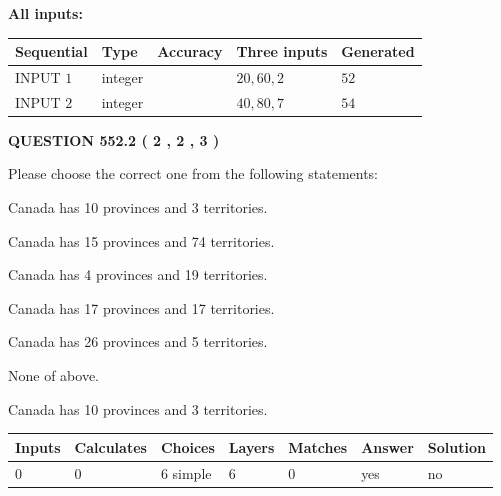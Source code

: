 \documentclass[12pt]{article}
\begin{document}
   
   
   
\noindent\vspace{0.1in}\hspace{-0.08in} {\textbf{\Large{All inputs: }}}
   
   
  
  
\noindent\begin{tabular}{|l|l|l|l|l|}
\hline
 Sequential & Type & Accuracy & Three inputs & Generated \\ 
\hline
 
 
  INPUT $  1 $ & integer &  & $
 20
 , 
 60
 , 
 2
 $ & $ 52 $ 
 \\  \hline  
 
 
  INPUT $  2 $ & integer &  & $
 40
 , 
 80
 , 
 7
 $ & $ 54 $ 
 \\  \hline  
 \end{tabular}
   
   
  
\vspace{0.2in}
  
{\textbf{\Large{QUESTION
552.2 
 ( 2 , 2 , 3 )
}}}
  
  
Please choose the correct one from the following statements:
 
 
Canada has 10  provinces and 3 territories.
 
 
Canada has  15 provinces and  74 territories.
 
 
Canada has   4 provinces and  19 territories.
 
 
Canada has  17 provinces and  17 territories.
 
 
Canada has  26 provinces and  5 territories.
 
 
 None of above.
 
 
\noindent{}
 
 
Canada has 10  provinces and 3 territories.
 
 
\noindent{}
 
 
   
   
   
   
\noindent\begin{tabular}{|l|l|l|l|l|l|l|}
 \hline
Inputs & Calculates & Choices & Layers & Matches & Answer & Solution \\ \hline
 0  & 
 0  & 
 6
  simple  
  & 
 6  & 
 0  & 
  yes & 
  no 
  \\ \hline
 \end{tabular}
   
\end{document}
